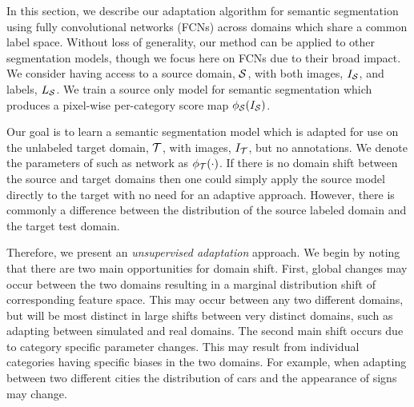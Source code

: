 \documentclass[10pt,twocolumn,letterpaper]{article}
\begin{document}
In this section, we describe our adaptation algorithm for semantic segmentation using fully convolutional networks (FCNs) across domains which share a common label space. Without loss of generality, our method can be applied to other segmentation models, though we focus here on FCNs due to their broad impact. We consider having access to a source domain, $\mathcal{S}$, with both images, ${I}_{\mathcal{S}}$, and labels, $L_{\mathcal{S}}$. 
We train a source only model for semantic segmentation which produces a pixel-wise per-category score map $\phi_{\mathcal{S}}({I}_{\mathcal{S}})$.

Our goal is to learn a semantic segmentation model which is adapted for use on the unlabeled target domain, $\mathcal{T}$, with images, ${I}_{\mathcal{T}}$, but no annotations. We denote the parameters of such as network as $\phi_{\mathcal{T}}(\cdot)$. If there is no domain shift between the source and target domains then one could simply apply the source model directly to the target with no need for an adaptive approach. 
However, there is commonly a difference between the distribution of the source labeled domain and the target test domain. 


Therefore, we present an \textit{unsupervised adaptation} approach. We begin by noting that there are two main opportunities for domain shift. First, global changes may occur between the two domains resulting in a marginal distribution shift of corresponding feature space. This may occur between any two different domains, but will be most distinct in large shifts between very distinct domains, such as adapting between simulated and real domains.
The second main shift occurs due to category specific parameter changes. This may result from individual categories having specific biases in the two domains. For example, when adapting between two different cities the distribution of cars and the appearance of signs may change.
\end{document}
